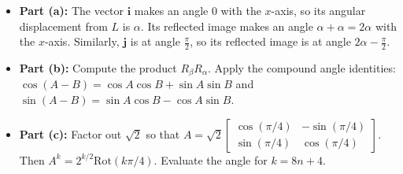 \begin{hint}
\begin{itemize}
    \item \textbf{Part (a):} The vector $\mathbf{i}$ makes an angle $0$ with the $x$-axis, so its angular displacement from $L$ is $\alpha$. Its reflected image makes an angle $\alpha + \alpha = 2\alpha$ with the $x$-axis. Similarly, $\mathbf{j}$ is at angle $\frac{\pi}{2}$, so its reflected image is at angle $2\alpha - \frac{\pi}{2}$.
    \item \textbf{Part (b):} Compute the product $R_\beta R_\alpha$. Apply the compound angle identities: $\cos(A-B) = \cos A\cos B + \sin A\sin B$ and $\sin(A-B) = \sin A\cos B - \cos A\sin B$.
    \item \textbf{Part (c):} Factor out $\sqrt{2}$ so that $A = \sqrt{2}\begin{bmatrix} \cos(\pi/4) & -\sin(\pi/4) \\ \sin(\pi/4) & \cos(\pi/4) \end{bmatrix}$. Then $A^k = 2^{k/2} \text{Rot}(k\pi/4)$. Evaluate the angle for $k = 8n + 4$.
\end{itemize}
\end{hint}

